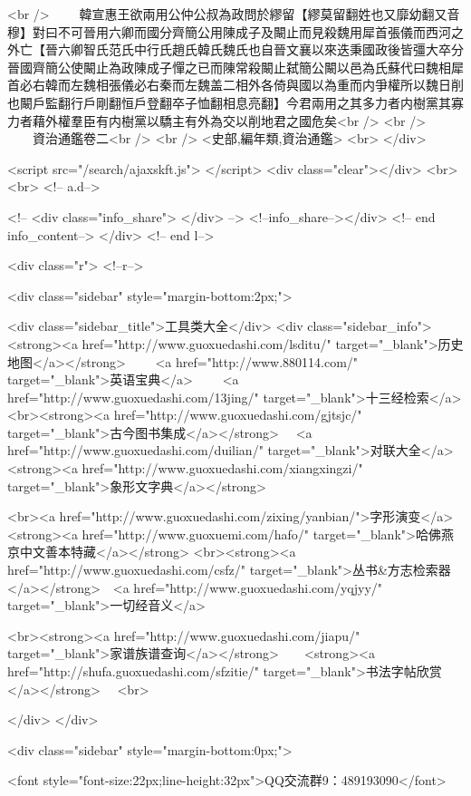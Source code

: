 <br />
　　韓宣惠王欲兩用公仲公叔為政問於繆留【繆莫留翻姓也又靡幼翻又音穆】對曰不可晉用六卿而國分齊簡公用陳成子及闞止而見殺魏用犀首張儀而西河之外亡【晉六卿智氏范氏中行氏趙氏韓氏魏氏也自晉文襄以來迭秉國政後皆彊大卒分晉國齊簡公使闞止為政陳成子憚之已而陳常殺闞止弑簡公闞以邑為氏蘇代曰魏相犀首必右韓而左魏相張儀必右秦而左魏盖二相外各倚與國以為重而内爭權所以魏日削也闞戶監翻行戶剛翻恒戶登翻卒子恤翻相息亮翻】今君兩用之其多力者内樹黨其寡力者藉外權羣臣有内樹黨以驕主有外為交以削地君之國危矣<br />
<br />
　　資治通鑑卷二<br />
<br />
<史部,編年類,資治通鑑>  <br>
   </div> 

<script src="/search/ajaxskft.js"> </script>
 <div class="clear"></div>
<br>
<br>
 <!-- a.d-->

 <!--
<div class="info_share">
</div> 
-->
 <!--info_share--></div>   <!-- end info_content-->
  </div> <!-- end l-->

<div class="r">   <!--r-->



<div class="sidebar"  style="margin-bottom:2px;">

 
<div class="sidebar_title">工具类大全</div>
<div class="sidebar_info">
<strong><a href="http://www.guoxuedashi.com/lsditu/" target="_blank">历史地图</a></strong>　　
<a href="http://www.880114.com/" target="_blank">英语宝典</a>　　
<a href="http://www.guoxuedashi.com/13jing/" target="_blank">十三经检索</a>　
<br><strong><a href="http://www.guoxuedashi.com/gjtsjc/" target="_blank">古今图书集成</a></strong>　
<a href="http://www.guoxuedashi.com/duilian/" target="_blank">对联大全</a>　<strong><a href="http://www.guoxuedashi.com/xiangxingzi/" target="_blank">象形文字典</a></strong>　

<br><a href="http://www.guoxuedashi.com/zixing/yanbian/">字形演变</a>　　<strong><a href="http://www.guoxuemi.com/hafo/" target="_blank">哈佛燕京中文善本特藏</a></strong>
<br><strong><a href="http://www.guoxuedashi.com/csfz/" target="_blank">丛书&方志检索器</a></strong>　<a href="http://www.guoxuedashi.com/yqjyy/" target="_blank">一切经音义</a>　　

<br><strong><a href="http://www.guoxuedashi.com/jiapu/" target="_blank">家谱族谱查询</a></strong>　　<strong><a href="http://shufa.guoxuedashi.com/sfzitie/" target="_blank">书法字帖欣赏</a></strong>　
<br>

</div>
</div>


<div class="sidebar" style="margin-bottom:0px;">

<font style="font-size:22px;line-height:32px">QQ交流群9：489193090</font>


